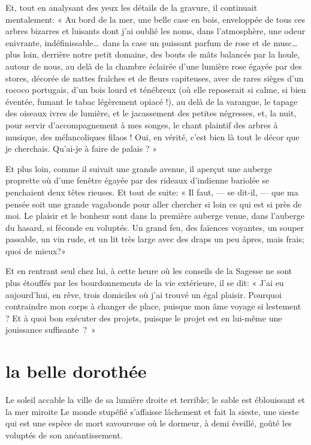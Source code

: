 Et, tout en analysant des yeux les détails de la gravure, il continuait
mentalement: « Au bord de la mer, une belle case en bois, enveloppée de
tous ces arbres bizarres et luisants dont j’ai oublié
les noms, dans l’atmosphère, une odeur enivrante,
indéfinissable\ldots\ dans la case un puissant parfum de rose et de musc\ldots
plus loin, derrière notre petit domaine, des bouts de mâts balancés par
la houle, autour de nous, au delà de la chambre éclairée
d’une lumière rose égayée par des stores, décorée de
nattes fraîches et de fleurs capiteuses, avec de rares sièges
d’un rococo portugais, d’un bois
lourd et ténébreux (où elle reposerait si calme, si bien éventée,
fumant le tabac légèrement opiacé !), au delà de la varangue, le tapage
des oiseaux ivres de lumière, et le jacassement des petites négresses,
et, la nuit, pour servir d’accompagnement à mes
songes, le chant plaintif des arbres à musique, des mélancoliques
filaos ! Oui, en vérité, c’est bien là tout le décor
que je cherchais. Qu’ai{}-je à faire de palais ? »

Et plus loin, comme il suivait une grande avenue, il aperçut une auberge
proprette où d’une fenêtre égayée par des rideaux
d’indienne bariolée se penchaient deux têtes rieuses.
Et tout de suite: « Il faut, --- se dit{}-il, --- que ma pensée soit une
grande vagabonde pour aller chercher si loin ce qui est si près de moi.
Le plaisir et le bonheur sont dans la première auberge venue, dans
l’auberge du hasard, si féconde en voluptés. Un grand
feu, des faïences voyantes, un souper passable, un vin rude, et un lit
très large avec des draps un peu âpres, mais frais; quoi de mieux?»

Et en rentrant seul chez lui, à cette heure où les conseils de la
Sagesse ne sont plus étouffés par les bourdonnements de la vie
extérieure, il se dit: « J’ai eu
aujourd’hui, en rêve, trois domiciles où
j’ai trouvé un égal plaisir. Pourquoi contraindre mon
corps à changer de place, puisque mon âme voyage si lestement ? Et à
quoi bon exécuter des projets, puisque le projet est en lui{}-même une
jouissance \mbox{suffisante ? »}

\quebra\section[La belle Dorothée]{la belle dorothée} 

Le soleil accable la ville de sa lumière droite et terrible; le sable
est éblouissant et la mer miroite Le monde stupéfié
s’affaisse lâchement et fait la sieste, une sieste qui
est une espèce de mort savoureuse où le dormeur, à demi éveillé, goûté
les voluptés de son anéantissement.

